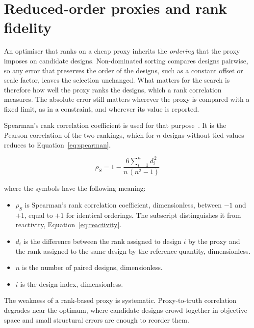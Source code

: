 \section{Reduced-order proxies and rank fidelity}
\label{sec:bg-proxy}

An optimiser that ranks on a cheap proxy inherits the \emph{ordering} that
the proxy imposes on candidate designs. Non-dominated sorting compares
designs pairwise, so any error that preserves the order of the designs,
such as a constant offset or scale factor, leaves the selection
unchanged. What matters for the search is therefore how well the proxy
ranks the designs, which a rank correlation measures. The absolute error
still matters wherever the proxy is compared with a fixed limit, as in a
constraint, and wherever its value is reported.

Spearman's rank correlation coefficient is used for that
purpose~\cite{kendall_gibbons_1990}. It is the Pearson correlation of
the two rankings, which for $n$ designs without tied values reduces to
Equation~\eqref{eq:spearman}.

\begin{equation}
\rho_S = 1 - \frac{6 \sum_{i=1}^{n} d_i^{\,2}}{n\,(n^{2}-1)}
\label{eq:spearman}
\end{equation}

\noindent where the symbols have the following meaning:

\begin{itemize}
  \item $\rho_S$ is Spearman's rank correlation coefficient,
        dimensionless, between $-1$ and $+1$, equal to $+1$ for
        identical orderings. The subscript distinguishes it from
        reactivity, Equation~\eqref{eq:reactivity}.

  \item $d_i$ is the difference between the rank assigned to design $i$
        by the proxy and the rank assigned to the same design by the
        reference quantity, dimensionless.

  \item $n$ is the number of paired designs, dimensionless.

  \item $i$ is the design index, dimensionless.
\end{itemize}

The weakness of a rank-based proxy is systematic. Proxy-to-truth
correlation degrades near the optimum, where candidate designs crowd
together in objective space and small structural errors are enough to
reorder them.


